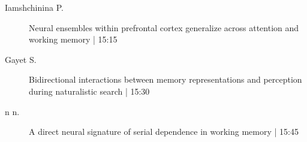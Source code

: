 \begin{symposium}
\begin{description}
                \item [ Iamshchinina P.] Neural ensembles within prefrontal cortex generalize across attention and working memory  \textcolor{mygray}{ | 15:15}    
                
                \item [ Gayet S.] Bidirectional interactions between memory representations and perception during naturalistic search \textcolor{mygray}{ | 15:30}    
                
                \item [n n.] A direct neural signature of serial dependence in working memory \textcolor{mygray}{ | 15:45}    
                
            \end{description} 
            \end{symposium}
            